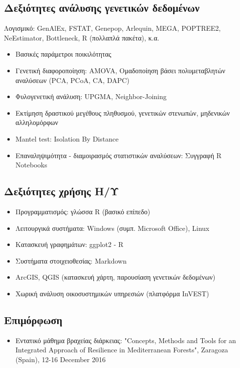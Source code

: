 \documentclass[12pt,]{scrartcl}
\begin{document}
\subsection{Δεξιότητες ανάλυσης γενετικών δεδομένων}\label{genetics}
\vspace{-3mm}
Λογισμικό: GenAlEx, FSTAT, Genepop, Arlequin, MEGA, POPTREE2, NeEstimator, Bottleneck, R (πολλαπλά πακέτα), κ.α.
\begin{itemize}
\vspace{-1mm}
\setlength\itemsep{-0.6em}
\item Βασικές παράμετροι ποικιλότητας
\item Γενετική διαφοροποίηση: AMOVA, Ομαδοποίηση βάσει πολυμεταβλητών αναλύσεων (PCA, PCoA, CA, DAPC)
\item Φυλογενετική ανάλυση: UPGMA, Neighbor-Joining
\item Εκτίμηση δραστικού μεγέθους πληθυσμού, γενετικών στενωπών, μηδενικών αλληλομόρφων 
\item Mantel test:  Isolation By Distance
\item Επαναληψιμότητα - διαμοιρασμός στατιστικών αναλύσεων: Συγγραφή R Notebooks
\end{itemize}

\subsection{Δεξιότητες χρήσης Η/Υ}\label{it}
\begin{itemize}
\vspace{-3mm}
\setlength\itemsep{-0.6em}
\item Προγραμματισμός: γλώσσα R (βασικό επίπεδο)
\item Λειτουργικά συστήματα: Windows (συμπ. Microsoft Office), Linux
\item Κατασκευή γραφημάτων: ggplot2 - R
\item Συστήματα στοιχειοθεσίας: Markdown
\item ArcGIS, QGIS (κατασκευή χάρτη, παρουσίαση γενετικών δεδομένων)
\item Χωρική ανάλυση οικοσυστημικών υπηρεσιών (πλατφόρμα InVEST)
\end{itemize}

\subsection{Επιμόρφωση}\label{courses}
\begin{itemize}
\vspace{-3mm}
\setlength\itemsep{-0.6em}
\item Εντατικό μάθημα βραχείας διάρκειας: "Concepts, Methods and Tools for an Integrated Approach of Resilience in Mediterranean Forests", Zaragoza (Spain), 12-16 December 2016
\end{itemize}
\end{document}
